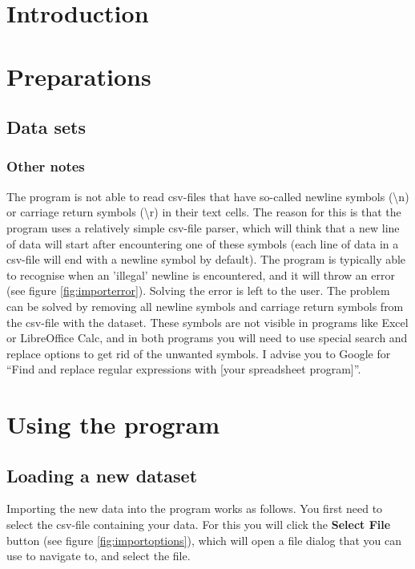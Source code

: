\documentclass{memoir}
\begin{document}
\chapter{Introduction}
\label{chap:introduction}

\chapter{Preparations}
\label{chap:preparations}

\section{Data sets}
\label{sec:datasets}


\subsection{Other notes}
\label{sec:othernotesdatasets}

The program is not able to read csv-files that have so-called newline symbols (\textbackslash n) or carriage return symbols (\textbackslash r) in their text cells. The reason for this is that the program uses a relatively simple csv-file parser, which will think that a new line of data will start after encountering one of these symbols (each line of data in a csv-file will end with a newline symbol by default). The program is typically able to recognise when an 'illegal' newline is encountered, and it will throw an error (see figure \ref{fig:importerror}). Solving the error is left to the user. The problem can be solved by removing all newline symbols and carriage return symbols from the csv-file with the dataset. These symbols are not visible in programs like Excel or LibreOffice Calc, and in both programs you will need to use special search and replace options to get rid of the unwanted symbols. I advise you to Google for ``Find and replace regular expressions with [your spreadsheet program]''. 

\chapter{Using the program}
\label{chap:usingtheprogram}

\section{Loading a new dataset}
\label{sec:loadingnewdataset}

Importing the new data into the program works as follows. You first need to select the csv-file containing your data. For this you will click the \textbf{Select File} button (see figure \ref{fig:importoptions}), which will open a file dialog that you can use to navigate to, and select the file.
\end{document}

